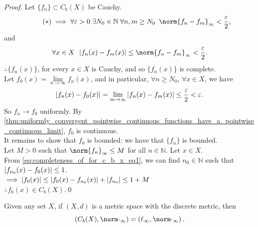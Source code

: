 \documentclass[notoc,notitlepage]{tufte-book}
\begin{document}
\begin{proof}
  Let $\{ f_n \} \subset C_b(X)$ be Cauchy.
  \begin{equation}\tag{$*$}\label{eq:completeness_of_for_c_b_x_eq1}
    \implies \forall \epsilon > 0 \; \exists N_0 \in \mathbb{N} \; \forall n, m \geq N_0 \enspace \norm{ f_n - f_m }_\infty < \frac{\epsilon}{2},
  \end{equation}
  and
  \begin{equation*}
    \forall x \in X \enspace \abs{ f_n(x) - f_m(x) } \leq \norm{ f_n - f_m }_\infty < \frac{\epsilon}{2}.
  \end{equation*}
  $\therefore \{ f_n(x) \}$, for every $x \in X$ is Cauchy, and so $\{ f_n (x) \}$ is complete. \\
  Let $f_0(x) = \lim\limits_{n \to \infty} f_n(x)$, and in particular, $\forall n \geq N_0$, $\forall x \in X$, we have
  \begin{equation*}
    \left| f_n(x) - f_0(x) \right| = \lim_{m \to \infty} \left| f_n(x) - f_m(x) \right| \leq \frac{\varepsilon}{2} < \varepsilon.
  \end{equation*}
  So $f_n \to f_0$ uniformly. By \cref{thm:uniformly_convergent_pointwise_continuous_functions_have_a_pointwise_continuous_limit}, $f_0$ is continuous. \\
  It remains to show that $f_0$ is bounded: we have that $\{ f_n \}$ is bounded. \\
  Let $M > 0$ such that $\norm{ f_n }_\infty \leq M$ for all $n \in \mathbb{N}$. Let $x \in X$. \\
  From \eqref{eq:completeness_of_for_c_b_x_eq1}, we can find $n_0 \in \mathbb{N}$ such that $\left| f_{n_0}(x) - f_0(x) \right| \leq 1$. \\
  $\implies \left| f_0(x) \right| \leq \left| f_0(x) - f_{n_0}(x) \right| + \left| f_{n_0} \right| \leq 1 + M$ \\
  $\therefore f_0(x) \in C_b(X)$.\qed\
\end{proof}

\begin{note}
  Given any set $X$, if $(X, d)$ is a metric space with the discrete metric, then
  \begin{equation*}
    \left( C_b(X), \norm\cdot_\infty \right) = \left( \ell_\infty, \norm\cdot_\infty \right).
  \end{equation*}
\end{note}


\end{document}
